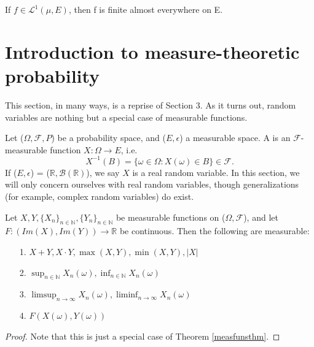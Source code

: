 \documentclass[11pt]{scrartcl}
\begin{document}
\begin{exercise}
If $f\in \mathscr{L}^1(\mu,E)$, then f is finite almost everywhere on E.
\end{exercise}




\section{Introduction to measure-theoretic probability}

This section, in many ways, is a reprise of Section 3. As it turns out, random variables are nothing but a special case of measurable functions.


\begin{definition}
Let ($\Omega,\mathcal{F},P$) be a probability space, and ($E,\mathcal{\epsilon}$) a measurable space. A  is an $\mathcal{F}$-measurable function $X: \Omega \rightarrow E$, i.e. $$X^{-1}(B)=\{\omega \in \Omega: X(\omega) \in B\} \in \mathcal{F}.$$
If ($E,\mathcal{\epsilon}$) = ($\mathbb{R},\mathcal{B}(\mathbb{R})$), we say $X$ is a real random variable. In this section, we will only concern ourselves with real random variables, though generalizations (for example, complex random variables) do exist.
\end{definition}

\begin{theorem}
Let $X, Y,\{X_n\}_{n\in \mathbb{N}},\{Y_n\}_{n\in \mathbb{N}}$ be measurable functions on ($\Omega,\mathcal{F}$), and let \\$F: (Im(X),Im(Y)) \rightarrow \mathbb{R}$ be continuous. Then the following are measurable:
\begin{itemize}
\item[1.] $X + Y, X\cdot Y, \max(X,Y), \min(X,Y), |X|$ 
\item[2.] $\sup_{n\in \mathbb{N}} X_n(\omega), \inf_{n\in \mathbb{N}} X_n(\omega)$
\item[3.] $\limsup_{n\rightarrow \infty} X_n(\omega), \liminf_{n\rightarrow \infty} X_n(\omega)$
\item[4.] $F(X(\omega),Y(\omega))$
\end{itemize}
\end{theorem}

\begin{proof}
Note that this is just a special case of Theorem \ref{measfunsthm}.
\end{proof}{}
\end{document}
